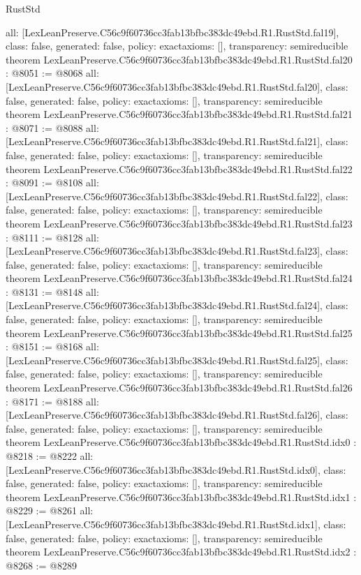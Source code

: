 \begin{lexlean}{RustStd}
\begin{coremodule}
{  all: [LexLeanPreserve.C56c9f60736cc3fab13bfbc383dc49ebd.R1.RustStd.fal19],
  class: false,
  generated: false,
  policy: exact{axioms: []},
  transparency: semireducible
}
theorem LexLeanPreserve.C56c9f60736cc3fab13bfbc383dc49ebd.R1.RustStd.fal20 : @8051 := @8068 {
  all: [LexLeanPreserve.C56c9f60736cc3fab13bfbc383dc49ebd.R1.RustStd.fal20],
  class: false,
  generated: false,
  policy: exact{axioms: []},
  transparency: semireducible
}
theorem LexLeanPreserve.C56c9f60736cc3fab13bfbc383dc49ebd.R1.RustStd.fal21 : @8071 := @8088 {
  all: [LexLeanPreserve.C56c9f60736cc3fab13bfbc383dc49ebd.R1.RustStd.fal21],
  class: false,
  generated: false,
  policy: exact{axioms: []},
  transparency: semireducible
}
theorem LexLeanPreserve.C56c9f60736cc3fab13bfbc383dc49ebd.R1.RustStd.fal22 : @8091 := @8108 {
  all: [LexLeanPreserve.C56c9f60736cc3fab13bfbc383dc49ebd.R1.RustStd.fal22],
  class: false,
  generated: false,
  policy: exact{axioms: []},
  transparency: semireducible
}
theorem LexLeanPreserve.C56c9f60736cc3fab13bfbc383dc49ebd.R1.RustStd.fal23 : @8111 := @8128 {
  all: [LexLeanPreserve.C56c9f60736cc3fab13bfbc383dc49ebd.R1.RustStd.fal23],
  class: false,
  generated: false,
  policy: exact{axioms: []},
  transparency: semireducible
}
theorem LexLeanPreserve.C56c9f60736cc3fab13bfbc383dc49ebd.R1.RustStd.fal24 : @8131 := @8148 {
  all: [LexLeanPreserve.C56c9f60736cc3fab13bfbc383dc49ebd.R1.RustStd.fal24],
  class: false,
  generated: false,
  policy: exact{axioms: []},
  transparency: semireducible
}
theorem LexLeanPreserve.C56c9f60736cc3fab13bfbc383dc49ebd.R1.RustStd.fal25 : @8151 := @8168 {
  all: [LexLeanPreserve.C56c9f60736cc3fab13bfbc383dc49ebd.R1.RustStd.fal25],
  class: false,
  generated: false,
  policy: exact{axioms: []},
  transparency: semireducible
}
theorem LexLeanPreserve.C56c9f60736cc3fab13bfbc383dc49ebd.R1.RustStd.fal26 : @8171 := @8188 {
  all: [LexLeanPreserve.C56c9f60736cc3fab13bfbc383dc49ebd.R1.RustStd.fal26],
  class: false,
  generated: false,
  policy: exact{axioms: []},
  transparency: semireducible
}
theorem LexLeanPreserve.C56c9f60736cc3fab13bfbc383dc49ebd.R1.RustStd.idx0 : @8218 := @8222 {
  all: [LexLeanPreserve.C56c9f60736cc3fab13bfbc383dc49ebd.R1.RustStd.idx0],
  class: false,
  generated: false,
  policy: exact{axioms: []},
  transparency: semireducible
}
theorem LexLeanPreserve.C56c9f60736cc3fab13bfbc383dc49ebd.R1.RustStd.idx1 : @8229 := @8261 {
  all: [LexLeanPreserve.C56c9f60736cc3fab13bfbc383dc49ebd.R1.RustStd.idx1],
  class: false,
  generated: false,
  policy: exact{axioms: []},
  transparency: semireducible
}
theorem LexLeanPreserve.C56c9f60736cc3fab13bfbc383dc49ebd.R1.RustStd.idx2 : @8268 := @8289 {
}
\end{coremodule}
\end{lexlean}
